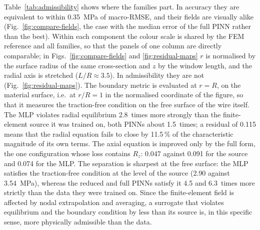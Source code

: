 Table~\ref{tab:admissibility} shows where the families part. In accuracy they are equivalent to within 0.35~MPa of macro-RMSE, and their fields are visually alike (Fig.~\ref{fig:compare-fields}, the case with the median error of the full PINN rather than the best). Within each component the colour scale is shared by the FEM reference and all families, so that the panels of one column are directly comparable; in Figs.~\ref{fig:compare-fields} and \ref{fig:residual-maps} $r$ is normalised by the surface radius of the same cross-section and $z$ by the window length, and the radial axis is stretched ($L/R \approx 3.5$). %
In admissibility they are not (Fig.~\ref{fig:residual-maps}). The boundary metric is evaluated at $r = R$, on the material surface, i.e.\ at $r/R = 1$ in the normalised coordinate of the figure, so that it measures the traction-free condition on the free surface of the wire itself. %
The MLP violates radial equilibrium 2.8~times more strongly than the finite-element source it was trained on, both PINNs about 1.5~times; a residual of 0.115 means that the radial equation fails to close by 11.5\,\% of the characteristic magnitude of its own terms. The axial equation is improved only by the full form, the one configuration whose loss contains $R_z$: 0.047 against 0.091 for the source and 0.074 for the MLP. The separation is sharpest at the free surface: the MLP satisfies the traction-free condition at the level of the source (2.90 against 3.54~MPa), whereas the reduced and full PINNs satisfy it 4.5 and 6.3~times more strictly than the data they were trained on. Since the finite-element field is affected by nodal extrapolation and averaging, a surrogate that violates equilibrium and the boundary condition by less than its source is, in this specific sense, more physically admissible than the data.

